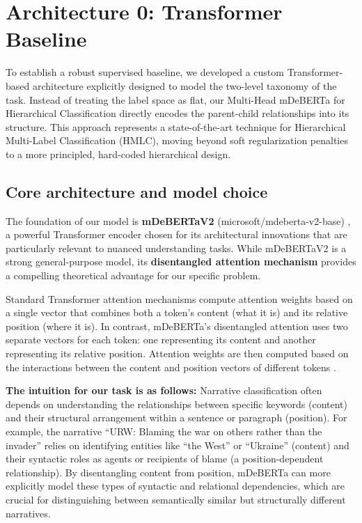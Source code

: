 \section{Architecture 0: Transformer Baseline}
\label{sec:transformer-baseline}
To establish a robust supervised baseline, we developed a custom Transformer-based architecture explicitly designed to model the two-level taxonomy of the task. Instead of treating the label space as flat, our Multi-Head mDeBERTa for Hierarchical Classification directly encodes the parent-child relationships into its structure. This approach represents a state-of-the-art technique for Hierarchical Multi-Label Classification (HMLC), moving beyond soft regularization penalties to a more principled, hard-coded hierarchical design.

\subsection{Core architecture and model choice}

The foundation of our model is \textbf{mDeBERTaV2} (microsoft/mdeberta-v2-base) \cite{he2020deberta}, a powerful Transformer encoder chosen for its architectural innovations that are particularly relevant to nuanced understanding tasks. While mDeBERTaV2 is a strong general-purpose model, its \textbf{disentangled attention mechanism} provides a compelling theoretical advantage for our specific problem.

Standard Transformer attention mechanisms \cite{vaswani2017attention} compute attention weights based on a single vector that combines both a token's content (what it is) and its relative position (where it is). In contrast, mDeBERTa's disentangled attention uses two separate vectors for each token: one representing its content and another representing its relative position. Attention weights are then computed based on the interactions between the content and position vectors of different tokens \cite{he2020deberta}.

\textbf{The intuition for our task is as follows:} Narrative classification often depends on understanding the relationships between specific keywords (content) and their structural arrangement within a sentence or paragraph (position). For example, the narrative ``URW: Blaming the war on others rather than the invader'' relies on identifying entities like ``the West'' or ``Ukraine'' (content) and their syntactic roles as agents or recipients of blame (a position-dependent relationship). By disentangling content from position, mDeBERTa can more explicitly model these types of syntactic and relational dependencies, which are crucial for distinguishing between semantically similar but structurally different narratives.

